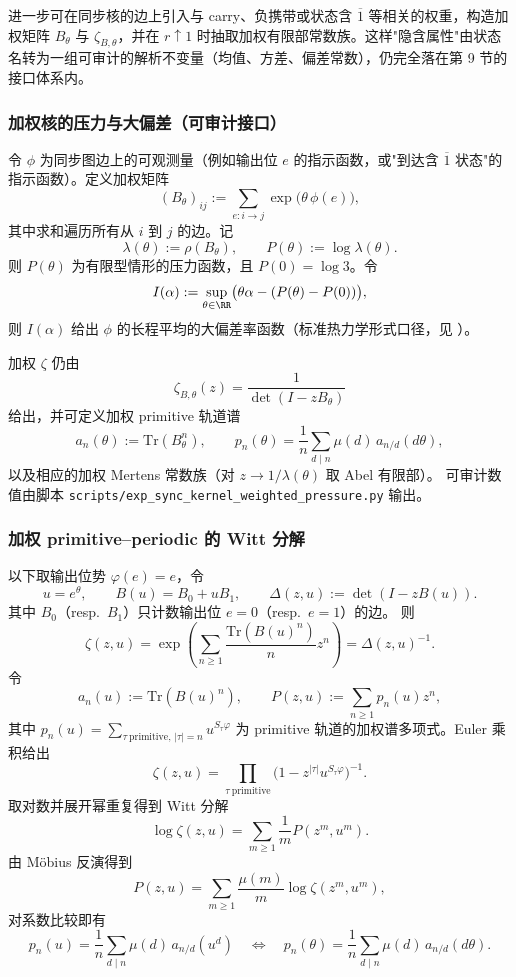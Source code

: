 \begin{remark}
进一步可在同步核的边上引入与 carry、负携带或状态含 $\overline{1}$ 等相关的权重，构造加权矩阵 $B_\theta$ 与 $\zeta_{B,\theta}$，并在 $r\uparrow 1$ 时抽取加权有限部常数族。这样"隐含属性"由状态名转为一组可审计的解析不变量（均值、方差、偏差常数），仍完全落在第 9 节的接口体系内。
\end{remark}

\subsubsection{加权核的压力与大偏差（可审计接口）}
令 $\phi$ 为同步图边上的可观测量（例如输出位 $e$ 的指示函数，或"到达含 $\overline{1}$ 状态"的指示函数）。定义加权矩阵
\[
(B_\theta)_{ij}:=\sum_{e:i\to j}\exp\bigl(\theta\,\phi(e)\bigr),
\]
其中求和遍历所有从 $i$ 到 $j$ 的边。记
\[
\lambda(\theta):=\rho(B_\theta),\qquad P(\theta):=\log\lambda(\theta).
\]
则 $P(\theta)$ 为有限型情形的压力函数，且 $P(0)=\log 3$。令
\[
I(\alpha):=\sup_{\theta\in\RR}\bigl(\theta\alpha-(P(\theta)-P(0))\bigr),
\]
则 $I(\alpha)$ 给出 $\phi$ 的长程平均的大偏差率函数（标准热力学形式口径，见 \cite{Ruelle1978Thermodynamic,ParryPollicott1990Zeta}）。

加权 $\zeta$ 仍由
\[
\zeta_{B,\theta}(z)=\frac{1}{\det(I-zB_\theta)}
\]
给出，并可定义加权 primitive 轨道谱
\[
a_n(\theta):=\mathrm{Tr}(B_\theta^n),\qquad
p_n(\theta)=\frac{1}{n}\sum_{d\mid n}\mu(d)\,a_{n/d}(d\theta),
\]
以及相应的加权 Mertens 常数族（对 $z\to 1/\lambda(\theta)$ 取 Abel 有限部）。
可审计数值由脚本 \texttt{scripts/exp\_sync\_kernel\_weighted\_pressure.py} 输出。

\subsubsection{加权 primitive--periodic 的 Witt 分解}\label{app:witt-weighted}
以下取输出位势 $\varphi(e)=e$，令
\[
u=e^\theta,\qquad B(u)=B_0+uB_1,\qquad \Delta(z,u):=\det(I-zB(u)).
\]
其中 $B_0$（resp.\ $B_1$）只计数输出位 $e=0$（resp.\ $e=1$）的边。
则
\[
\zeta(z,u)=\exp\!\left(\sum_{n\ge 1}\frac{\mathrm{Tr}(B(u)^n)}{n}z^n\right)=\Delta(z,u)^{-1}.
\]
令
\[
a_n(u):=\mathrm{Tr}(B(u)^n),\qquad
P(z,u):=\sum_{n\ge 1}p_n(u)z^n,
\]
其中
\(
p_n(u)=\sum_{\tau\ \mathrm{primitive},\,|\tau|=n}u^{S_\tau\varphi}
\)
为 primitive 轨道的加权谱多项式。Euler 乘积给出
\[
\zeta(z,u)=\prod_{\tau\ \mathrm{primitive}}\bigl(1-z^{|\tau|}u^{S_\tau\varphi}\bigr)^{-1}.
\]
取对数并展开幂重复得到 Witt 分解
\[
\log\zeta(z,u)=\sum_{m\ge 1}\frac{1}{m}P(z^m,u^m).
\]
由 Möbius 反演得到
\[
P(z,u)=\sum_{m\ge 1}\frac{\mu(m)}{m}\log\zeta(z^m,u^m),
\]
对系数比较即有
\[
p_n(u)=\frac{1}{n}\sum_{d\mid n}\mu(d)\,a_{n/d}(u^d)
\quad\Longleftrightarrow\quad
p_n(\theta)=\frac{1}{n}\sum_{d\mid n}\mu(d)\,a_{n/d}(d\theta).
\]

